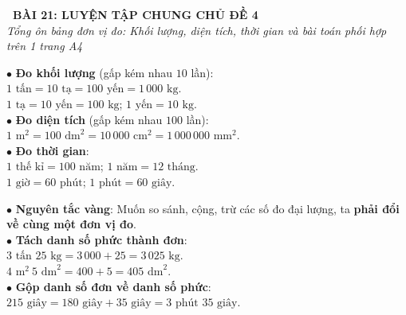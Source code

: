 \documentclass[14pt,a4paper,oneside]{extbook}
\begin{document}
\noindent
\begin{tcolorbox}[
  enhanced,
  colback=teal!8!white,
  colframe=teal!80!black,
  arc=3mm, boxrule=1pt,
  left=3mm, right=3mm, top=2mm, bottom=2mm,
  halign=center
]
  {\Large\bfseries\color{teal!90!black}\faBookmark\ BÀI 21: LUYỆN TẬP CHUNG CHỦ ĐỀ 4}\\[1.5pt]
  {\footnotesize\itshape\color{black!75} Tổng ôn bảng đơn vị đo: Khối lượng, diện tích, thời gian và bài toán phối hợp trên 1 trang A4}
\end{tcolorbox}

\vspace{2mm}

\noindent
\begin{minipage}[t]{0.49\textwidth}
  \begin{tcolorbox}[
    enhanced,
    title={\footnotesize\bfseries\color{white}\faTable\ 1. Bảng quy đổi 3 đại lượng cốt lõi},
    colback=blue!2!white,
    colframe=blue!75!black,
    arc=2.5mm, boxrule=0.8pt, top=1.8mm, bottom=1.8mm, left=2mm, right=2mm
  ]
    \footnotesize
    $\bullet$ \textbf{Đo khối lượng} (gấp kém nhau $10$ lần):\\
    $1\text{ tấn} = 10\text{ tạ} = 100\text{ yến} = 1\,000\text{ kg}$.\\
    $1\text{ tạ} = 10\text{ yến} = 100\text{ kg}$; $1\text{ yến} = 10\text{ kg}$.\\[1mm]
    $\bullet$ \textbf{Đo diện tích} (gấp kém nhau $100$ lần):\\
    $1\text{ m}^2 = 100\text{ dm}^2 = 10\,000\text{ cm}^2 = 1\,000\,000\text{ mm}^2$.\\[1mm]
    $\bullet$ \textbf{Đo thời gian}:\\
    $1\text{ thế kỉ} = 100\text{ năm}$; $1\text{ năm} = 12\text{ tháng}$.\\
    $1\text{ giờ} = 60\text{ phút}$; $1\text{ phút} = 60\text{ giây}$.
  \end{tcolorbox}
\end{minipage}%
\hfill
\begin{minipage}[t]{0.49\textwidth}
  \begin{tcolorbox}[
    enhanced,
    title={\footnotesize\bfseries\color{white}\faCalculator\ 2. Phương pháp giải toán đại lượng},
    colback=teal!2!white,
    colframe=teal!75!black,
    arc=2.5mm, boxrule=0.8pt, top=1.8mm, bottom=1.8mm, left=2mm, right=2mm
  ]
    \footnotesize
    $\bullet$ \textbf{Nguyên tắc vàng}: Muốn so sánh, cộng, trừ các số đo đại lượng, ta \textbf{phải đổi về cùng một đơn vị đo}.\\
    $\bullet$ \textbf{Tách danh số phức thành đơn}:\\
    $3\text{ tấn } 25\text{ kg} = 3\,000 + 25 = 3\,025\text{ kg}$.\\
    $4\text{ m}^2\ 5\text{ dm}^2 = 400 + 5 = 405\text{ dm}^2$.\\
    $\bullet$ \textbf{Gộp danh số đơn về danh số phức}:\\
    $215\text{ giây} = 180\text{ giây} + 35\text{ giây} = 3\text{ phút } 35\text{ giây}$.
  \end{tcolorbox}
\end{minipage}
\end{document}
